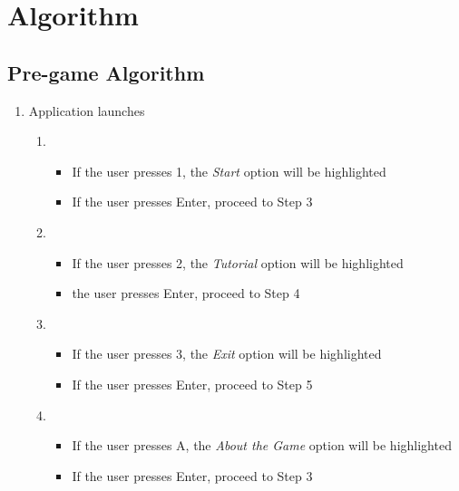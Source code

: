 \section{Algorithm}
\subsection{Pre-game Algorithm}

\begin{enumerate}
    \item Application launches
    \begin{enumerate}[label=\alph*.]
        \item
            \begin{itemize}[label={}]
                \item If the user presses 1, the \emph{Start} option will be highlighted
                \item \hspace{1cm} If the user presses Enter, proceed to Step 3
            \end{itemize}
        \item 
            \begin{itemize}[label={}]
                \item If the user presses 2, the \emph{Tutorial} option will be highlighted
                \item \hspace{1cm} the user presses Enter, proceed to Step 4
            \end{itemize}
        \item 
            \begin{itemize}[label={}]
                \item  If the user presses 3, the \emph{Exit} option will be highlighted
                \item \hspace{1cm} If the user presses Enter, proceed to Step 5
            \end{itemize}
        \item 
            \begin{itemize}[label={}]
                \item  If the user presses A, the \emph{About the Game} option will be highlighted
                \item \hspace{1cm} If the user presses Enter, proceed to Step 3
            \end{itemize}
        

\end{enumerate}
\end{enumerate}
